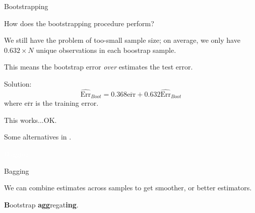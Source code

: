 \documentclass[xcolor={table}, handout]{beamer}
\begin{document}



\begin{frame}{Bootstrapping}

\begin{wideitemize}
\item How does the bootstrapping procedure perform?\pause
\item We still have the problem of too-small sample size\pause; on average, we only have $0.632 \times N$ unique observations in each boostrap sample. \pause
\item This means the bootstrap error \textit{over} estimates the test error. 
\item Solution: 
\[
\widehat{\textrm{Err}}_{Boot} = 0.368 \overline{\textrm{err}} + 0.632 \widehat{\textrm{Err}}_{Boot}  
\]
where $\overline{\textrm{err}}$ is the training error. \pause
\item This works...OK. \pause
\item Some alternatives in \cite{hastie2009elements}. 
\end{wideitemize}

\end{frame}




\begin{transitionframe}
\centering

\LARGE \textcolor{white}{Bagging.}

\end{transitionframe}
\begin{frame}{Bagging}

\begin{wideitemize}
\item We can combine estimates across samples to get smoother, or better estimators. \pause
\item \textcolor{Contrast6l}{\textbf{B}}ootstrap \textcolor{Contrast6l}{\textbf{agg}}regat\textcolor{Contrast6l}{\textbf{ing}}.
\end{wideitemize}

\end{frame}
\end{document}
